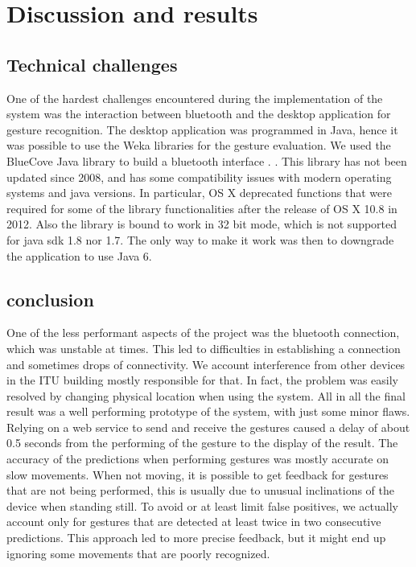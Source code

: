 \section{Discussion and results}

\subsection{Technical challenges}
One of the hardest challenges encountered during the implementation of the system was the interaction between bluetooth and the desktop application for gesture recognition.
The desktop application was programmed in Java, hence it was possible to use the Weka libraries for the gesture evaluation.
We used the BlueCove Java library to build a bluetooth interface \cite{bluecove}. .
This library has not been updated since 2008, and has some compatibility issues with modern operating systems and java versions.
In particular, OS X deprecated functions that were required for some of the library functionalities after the release of OS X 10.8 in 2012.
Also the library is bound to work in 32 bit mode, which is not supported for java sdk 1.8 nor 1.7.
The only way to make it work was then to downgrade the application to use Java 6.

\subsection{conclusion}

One of the less performant aspects of the project was the bluetooth connection, which was unstable at times. 
This led to difficulties in establishing a connection and sometimes drops of connectivity.
We account interference from other devices in the ITU building mostly responsible for that. 
In fact, the problem was easily resolved by changing physical location when using the system.
All in all the final result was a well performing prototype of the system, with just some minor flaws.
Relying on a web service to send and receive the gestures caused a delay of about 0.5 seconds from the performing of the gesture to the display of the result.
The accuracy of the predictions when performing gestures was mostly accurate on slow movements. When not moving, it is possible to get feedback for gestures that are not being performed, this is usually due to unusual inclinations of the device when standing still.
To avoid or at least limit false positives, we actually account only for gestures that are detected at least twice in two consecutive predictions. 
This approach led to more precise feedback, but it might end up ignoring some movements that are poorly recognized.

